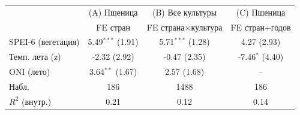 \begin{tabular}{lccc}
\toprule
 & (A) Пшеница & (B) Все культуры & (C) Пшеница \\
 & FE стран & FE страна$\times$культура & FE стран+годов \\
\midrule
SPEI-6 (вегетация) & 5.49$^{***}$ (1.91) & 5.71$^{***}$ (1.28) & 4.27 (2.93) \\
Темп. лета (z) & -2.32 (2.92) & -0.47 (2.35) & -7.46$^{*}$ (4.40) \\
ONI (лето) & 3.64$^{**}$ (1.67) & 2.57 (1.68) & -- \\
\midrule
Набл. & 186 & 1488 & 186 \\
$R^2$ (внутр.) & 0.21 & 0.12 & 0.14 \\
\bottomrule
\end{tabular}